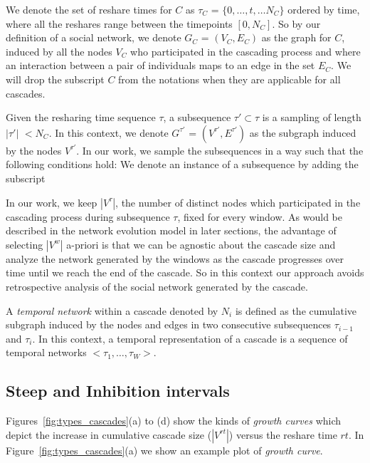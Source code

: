 \documentclass[smallextended]{svjour3}       %
\theoremstyle{definition}
\begin{document}
 
  We denote the set of reshare times for $C$ as $\tau_C$ = $\{0, \dots, t, \ldots N_C\}$ ordered by time, where all the reshares range between the timepoints $[0, N_C]$. So by our definition of a social network, we denote $G_C$ = $(V_C, E_C)$ as the graph for $C$, induced by all the nodes $V_C$ who participated in the cascading process and where an interaction between a pair of individuals maps to an edge in the set $E_C$. We will drop the subscript $C$ from the notations when they are applicable for all cascades.
 
Given the resharing time sequence $\tau$, a subsequence $\tau' \subset \tau$ is a sampling of length $|\tau'|$ $< N_C$. In this context,  we denote $G^{\tau'}$ = $(V^{\tau'}, E^{\tau'})$ as the subgraph induced by the nodes $V^{\tau'}$. In our work, we sample the subsequences in a way such that the following conditions hold:
We denote an instance of a subsequence by adding the subscript

In our work, we keep $|V^{\tau}|$, the number of distinct nodes which participated in the cascading process during subsequence $\tau$, fixed for every window. As would be described in the network evolution model in later sections, the advantage of selecting $|V^w|$ a-priori is that we can be agnostic about the cascade size and analyze the network generated by the windows as the cascade progresses over time until we reach the end of the cascade. So in this context our approach avoids retrospective analysis of the social network generated by the cascade.

A \textit{temporal network} within a cascade denoted by $N_i$ is defined as the cumulative subgraph induced by the nodes and edges in two consecutive subsequences $\tau_{i-1}$ and $\tau_i$. In this context, a temporal representation of a cascade is a sequence of temporal networks $<\tau_1, \ldots, \tau_W>$.


\subsection{Steep and Inhibition intervals}
Figures~\ref{fig:types_cascades}(a) to (d) show the kinds of \textit{growth curves} which depict the increase in cumulative cascade size ($|V^{rt}|$) versus the reshare time $rt$. In Figure~\ref{fig:types_cascades}(a) we show an example plot of \textit{growth curve}. 
\end{document}
